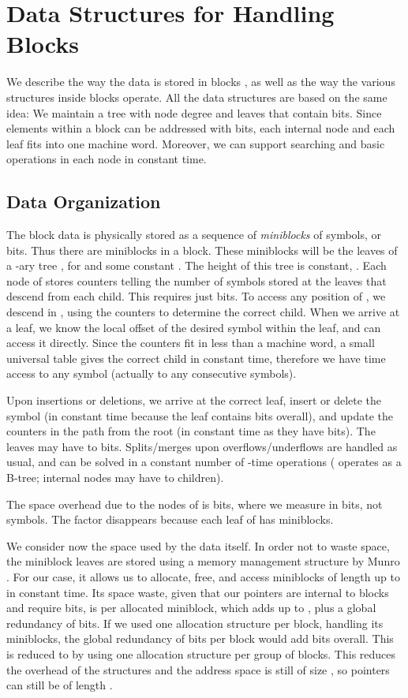 \documentclass[11pt]{article}
\begin{document}
\section{Data Structures for Handling Blocks} \label{app:A}

We describe the way the data is stored in blocks , as well as 
the way the various structures inside blocks operate. All the data 
structures are based on the same idea: We maintain a tree with node degree 
 and leaves that contain  bits. Since elements 
within a block can be addressed with  bits, each internal node 
and each leaf fits into one machine word. Moreover, we can support searching 
and basic operations  in each node in constant time.  

\subsection{Data Organization}

The block data is physically stored as a sequence of {\em miniblocks} of
 symbols, or  bits. Thus there are 
 mini\-blocks in a block. These miniblocks will be the 
leaves of a -ary tree , for  and some 
constant . The height of this tree is constant, . 
Each node of  stores  counters telling the number 
of symbols stored at the leaves that descend from each child. This requires 
just  bits. To access any position of ,
we descend in , using the counters to determine the correct child.
When we arrive at a leaf, we know the local offset of the desired symbol
within the leaf, and can access it directly. Since the counters fit in 
less than a machine word, a small universal table gives the correct child in 
constant time, therefore we have  time access to any symbol (actually to any 
 consecutive symbols).

Upon insertions or deletions, we arrive at the correct leaf, insert or delete 
the symbol (in constant time because the leaf contains  bits
overall), and update the counters in the path from the root (in constant time
as they have  bits). The leaves may have  to  bits.
Splits/merges upon overflows/underflows are handled as usual, and can be
solved in a constant number of -time operations (
operates as a B-tree; internal nodes may have  to  children).

The space overhead due to the nodes of  is
 bits, where we measure
 in bits, not symbols. The factor  disappears 
because each leaf of  has  miniblocks. 

We consider now the space used by the data itself.
In order not to waste space, the miniblock leaves are stored using a memory
management structure by Munro \cite{Mun86}. For our case, it allows us to 
allocate, free, and access  miniblocks of length up to  in
constant time. Its space waste, given that our pointers are internal to blocks
and require 
bits, is  per allocated miniblock, which adds up to
, plus a global redundancy
of  bits.
If we used one allocation structure per block, handling its miniblocks,
the global redundancy of  bits per block would add
 bits 
overall. This is reduced to  by
using one allocation structure per group of  blocks. This
reduces the overhead of the structures and the address space is
still of size , so pointers can still be of length .
\end{document}
